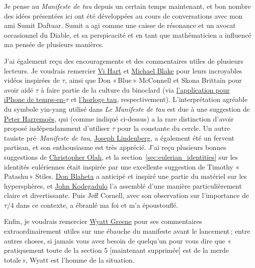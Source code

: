 Je pense au \emph{Manifeste de tau} depuis un certain temps maintenant, et bon nombre des idées présentées ici ont été développées au cours de conversations avec mon ami Sumit Daftuar. Sumit a agi comme une caisse de résonance et un avocat occasionnel du Diable, et sa perspicacité et en tant que mathématicien a influencé ma pensée de plusieurs manières.

J'ai également reçu des encouragements et des commentaires utiles de plusieurs lecteurs. Je voudrais remercier \href{https://www.youtube.com/watch?v=jG7vhMMXagQ}{Vi Hart} et \href{https://www.youtube.com/watch?v=3174T-3-59Q}{Michael Blake} pour leurs incroyables vidéos inspirées de $\tau$, ainsi que Don «\,Blue\,» McConnell et Skona Brittain pour avoir aidé $\tau$ à faire partie de la culture du binoclard (via \href{http://tauclock.com/}{l'application pour iPhone de temps-en-$\tau$} et \href{http://www.sbcrafts.net/clocks/}{l'horloge tau}, respectivement). L'interprétation agréable du symbole yin-yang utilisé dans \emph{Le Manifeste de tau} est due à une suggestion de \href{http://www.harremoes.dk/Peter/}{Peter Harremoës}, qui (comme indiqué ci-dessus) a la rare distinction d'avoir proposé indépendamment d'utiliser $\tau$ pour la constante du cercle. Un autre tauiste pré--\emph{Manifeste de tau}, \href{https://sites.google.com/site/taubeforeitwascool/}{Joseph Lindenberg}, a également été un fervent partisan, et son enthousiasme est très apprécié. J'ai reçu plusieurs bonnes suggestions de \href{https://christopherolah.wordpress.com/about-me}{Christopher Olah}, et la section~\ref{sec:eulerian_identities} sur les identités eulériennes était inspirée par une excellente suggestion de Timothy «\,Patashu\,» Stiles. \href{http://www.blahedo.org/blog/archives/001083.html}{Don Blaheta} a anticipé et inspiré une partie du matériel sur les hypersphères, et \href{https://bit.ly/2WyHqmK}{John Kodegadulo} l'a assemblé d'une manière particulièrement claire et divertissante. Puis Jeff Cornell, avec son observation sur l'importance de $\tau/4$ dans ce contexte, a ébranlé ma foi et m'a époustouflé.

Enfin, je voudrais remercier \href{https://techiferous.com/}{Wyatt Greene} pour ses commentaires extraordinairement utiles sur une ébauche du manifeste avant le lancement\,; entre autres choses, si jamais vous avez besoin de quelqu'un pour vous dire que «\,pratiquement toute de la section 5 [maintenant supprimée] est de la merde totale\,», Wyatt est l'homme de la situation.



